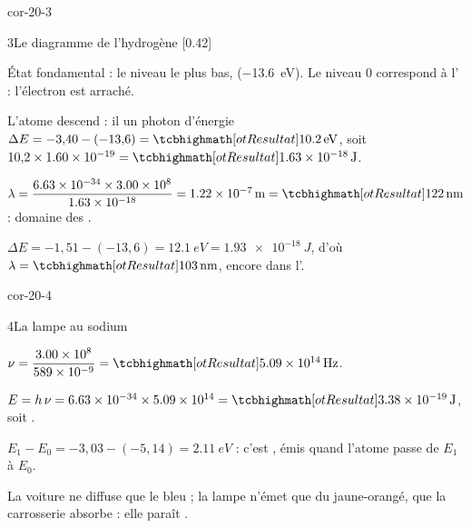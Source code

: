 \begin{blocLivre}{cor-20-3}
\begin{corrige}{3}{Le diagramme de l'hydrogène}
[0.42]{\begin{questions}
\item État fondamental : le niveau le plus bas,  (\qty{-13,6}{eV}). Le niveau 0 correspond à l' : l'électron est arraché.
\item L'atome descend : il  un photon d'énergie $\Delta E=-3{,}40-(-13{,}6)=\res{\qty{10,2}{eV}}$, soit $10{,}2\times\num{1,60e-19}=\res{\qty{1,63e-18}{J}}$.
\item $\lambda=\dfrac{\num{6,63e-34}\times\num{3,00e8}}{\num{1,63e-18}}=\qty{1,22e-7}{m}=\res{\qty{122}{nm}}$ : domaine des .
\item $\Delta E=-1{,}51-(-13{,}6)=\qty{12,1}{eV}=\qty{1,93e-18}{J}$, d'où $\lambda=\res{\qty{103}{nm}}$, encore dans l'.
\end{questions}}
\end{corrige}
\end{blocLivre}
\begin{blocLivre}{cor-20-4}
\begin{corrige}{4}{La lampe au sodium}
\begin{questions}
\item $\nu=\dfrac{\num{3,00e8}}{\num{589e-9}}=\res{\qty{5,09e14}{Hz}}$.
\item $E=h\,\nu=\num{6,63e-34}\times\num{5,09e14}=\res{\qty{3,38e-19}{J}}$, soit .
\item $E_1-E_0=-3{,}03-(-5{,}14)=\qty{2,11}{eV}$ : c'est , émis quand l'atome passe de $E_1$ à $E_0$.
\item La voiture ne diffuse que le bleu ; la lampe n'émet que du jaune-orangé, que la carrosserie absorbe : elle paraît .
\end{questions}
\end{corrige}
\end{blocLivre}
